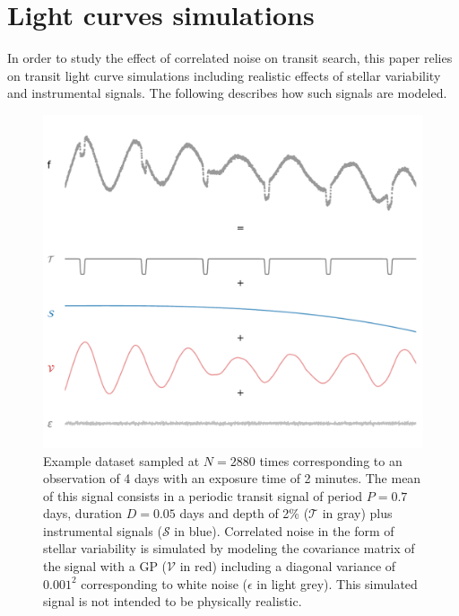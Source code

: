 \documentclass[modern]{aastex631}
\begin{document}
\newpage
\appendix
\section{Light curves simulations}\label{signals_simulations}

In order to study the effect of correlated noise on transit search, this paper relies on transit light curve simulations including realistic effects of stellar variability and instrumental signals. The following describes how such signals are modeled.
\begin{figure}[H]
    \begin{centering}
        \includegraphics[width=\linewidth]{../workflows/principle/figures/principle_dataset_decomposed.pdf}
        \caption{Example dataset sampled at $N=2880$ times corresponding to an observation of 4 days with an exposure time of 2 minutes. The mean of this signal consists in a periodic transit signal of period $P=0.7$ days, duration $D=0.05$ days and depth of 2\% ($\mathcal{T}$ in gray) plus instrumental signals ($\mathcal{S}$ in blue). Correlated noise in the form of stellar variability is simulated by modeling the covariance matrix of the signal with a GP ($\mathcal{V}$ in red) including a diagonal variance of $0.001^2$ corresponding to white noise ($\epsilon$ in light grey). This simulated signal is not intended to be physically realistic.}
        \label{fig:app_principle_dataset}
    \end{centering}
\end{figure}
\end{document}

